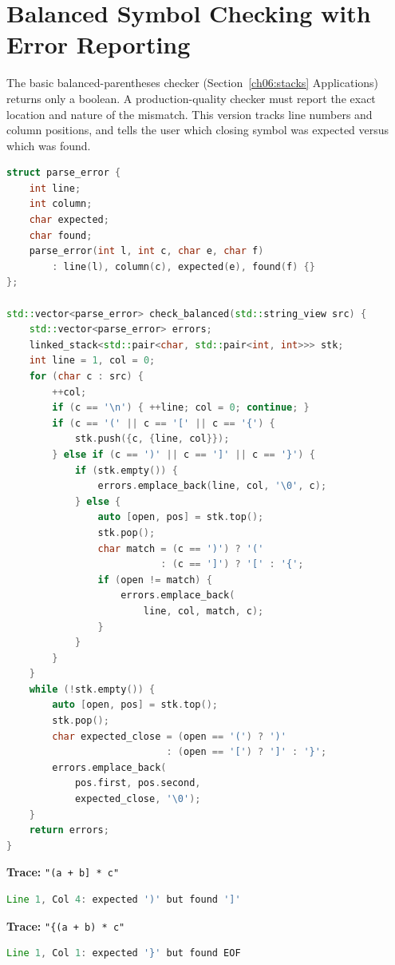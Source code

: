 \section{Balanced Symbol Checking with Error Reporting}

The basic balanced-parentheses checker (Section~\ref{ch06:stacks} Applications) returns only a boolean. A production-quality checker must report the exact location and nature of the mismatch. This version tracks line numbers and column positions, and tells the user which closing symbol was expected versus which was found.

\begin{lstlisting}[language=C++]
struct parse_error {
    int line;
    int column;
    char expected;
    char found;
    parse_error(int l, int c, char e, char f)
        : line(l), column(c), expected(e), found(f) {}
};

std::vector<parse_error> check_balanced(std::string_view src) {
    std::vector<parse_error> errors;
    linked_stack<std::pair<char, std::pair<int, int>>> stk;
    int line = 1, col = 0;
    for (char c : src) {
        ++col;
        if (c == '\n') { ++line; col = 0; continue; }
        if (c == '(' || c == '[' || c == '{') {
            stk.push({c, {line, col}});
        } else if (c == ')' || c == ']' || c == '}') {
            if (stk.empty()) {
                errors.emplace_back(line, col, '\0', c);
            } else {
                auto [open, pos] = stk.top();
                stk.pop();
                char match = (c == ')') ? '('
                           : (c == ']') ? '[' : '{';
                if (open != match) {
                    errors.emplace_back(
                        line, col, match, c);
                }
            }
        }
    }
    while (!stk.empty()) {
        auto [open, pos] = stk.top();
        stk.pop();
        char expected_close = (open == '(') ? ')'
                            : (open == '[') ? ']' : '}';
        errors.emplace_back(
            pos.first, pos.second,
            expected_close, '\0');
    }
    return errors;
}
\end{lstlisting}

\textbf{Trace:} \texttt{"(a + b] * c"}

\begin{lstlisting}[language=Java]
Line 1, Col 4: expected ')' but found ']'
\end{lstlisting}

\textbf{Trace:} \texttt{"\{(a + b) * c"}

\begin{lstlisting}[language=Java]
Line 1, Col 1: expected '}' but found EOF
\end{lstlisting}

